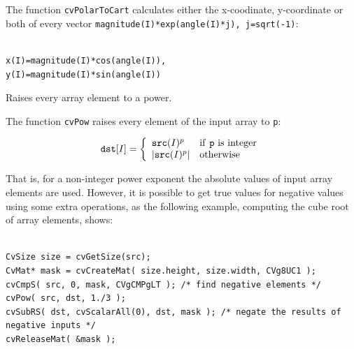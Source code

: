 \begin{description}
\end{description}

The function \texttt{cvPolarToCart} calculates either the x-coodinate, y-coordinate or both of every vector \texttt{magnitude(I)*exp(angle(I)*j), j=sqrt(-1)}:

\begin{lstlisting}

x(I)=magnitude(I)*cos(angle(I)),
y(I)=magnitude(I)*sin(angle(I))

\end{lstlisting}


\label{Pow}

Raises every array element to a power.


\begin{description}
\end{description}


The function \texttt{cvPow} raises every element of the input array to \texttt{p}:

\[
\texttt{dst} [I] = \left\{ \begin{array}{l l} \texttt{src}(I)^p & \mbox{if \texttt{p} is integer}\\ |\texttt{src}(I)^p| & \mbox{otherwise}\\ \end{array} \right.
\]

That is, for a non-integer power exponent the absolute values of input array elements are used. However, it is possible to get true values for negative values using some extra operations, as the following example, computing the cube root of array elements, shows:

\begin{lstlisting}

CvSize size = cvGetSize(src);
CvMat* mask = cvCreateMat( size.height, size.width, CVg8UC1 );
cvCmpS( src, 0, mask, CVgCMPgLT ); /* find negative elements */
cvPow( src, dst, 1./3 );
cvSubRS( dst, cvScalarAll(0), dst, mask ); /* negate the results of negative inputs */
cvReleaseMat( &mask );

\end{lstlisting}

